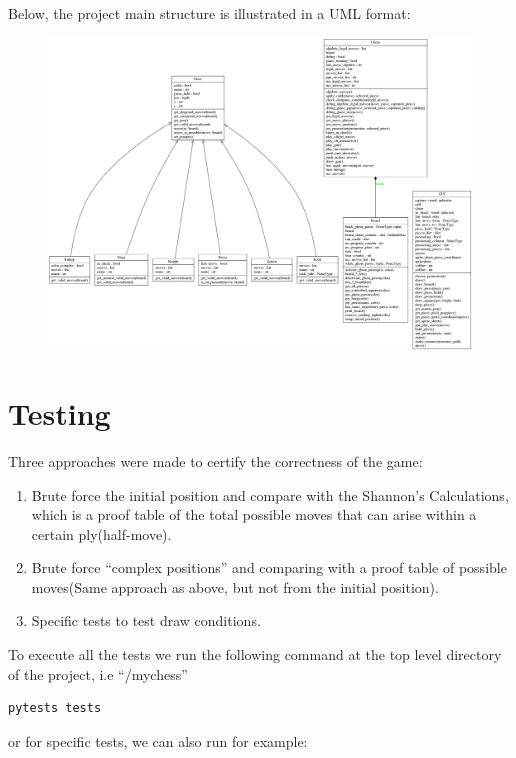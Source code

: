 \documentclass[10pt]{article}
\begin{document}
Below, the project main structure is illustrated in a UML format:

\begin{figure}[H]
    \includegraphics[scale=0.25]{fig/classes_Chess.png}
\end{figure}


\section{Testing}

Three approaches were made to certify the correctness of the game:

\begin{enumerate}[label=\arabic*)]
\item Brute force the initial position and compare with the Shannon's
    Calculations, which is a proof table of the total possible moves
    that can arise within a certain ply(half-move).
\item Brute force ``complex positions'' and comparing with a proof table of possible
    moves(Same approach as above, but not from the initial position).
\item Specific tests to test draw conditions.
\end{enumerate}

To execute all the tests we run the following command at the top level directory
of the project, i.e ``/mychess''
\begin{lstlisting}
pytests tests
\end{lstlisting}

or for specific tests, we can also run for example:
\end{document}
